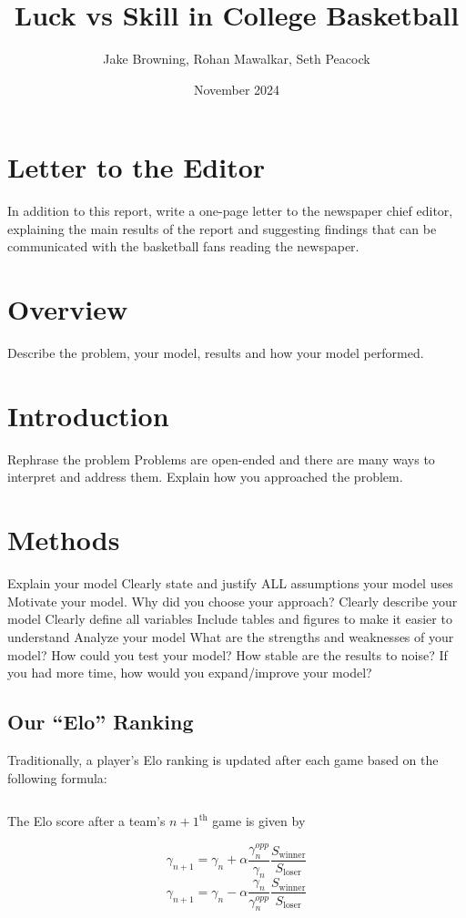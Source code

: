 \documentclass{article}
\title{Luck vs Skill in College Basketball}
\author{Jake Browning, Rohan Mawalkar, Seth Peacock}
\date{November 2024}
\begin{document}
\maketitle

\section{Letter to the Editor}
In addition to this report, write a one-page letter to the newspaper chief editor, explaining the main results of
the report and suggesting findings that can be communicated with the basketball fans reading the newspaper.

\section{Overview}
Describe the problem, your model, results and how your model performed.

\section{Introduction}
Rephrase the problem
Problems are open-ended and there are many ways to interpret and address them. Explain how you approached the problem.

\section{Methods}
Explain your model
Clearly state and justify ALL assumptions your model uses
Motivate your model. Why did you choose your approach?
Clearly describe your model
Clearly define all variables
Include tables and figures to make it easier to understand
Analyze your model
What are the strengths and weaknesses of your model?
How could you test your model? How stable are the results to noise? 
If you had more time, how would you expand/improve your model?

\subsection{Our ``Elo'' Ranking}
Traditionally, a player's Elo ranking is updated after each game based on the following formula:

\[
\]


The Elo score after a team's $n+1^{\text{th}}$ game is given by

\[
\gamma_{n+1} = \gamma_n + \alpha\frac{\gamma^{opp}_n}{\gamma_n}\frac{S_{\text{winner}}}{S_{\text{loser}}}
\]
\[
\gamma_{n+1} = \gamma_n - \alpha\frac{\gamma_n}{\gamma^{opp}_n}\frac{S_{\text{winner}}}{S_{\text{loser}}}
\]
\end{document}
